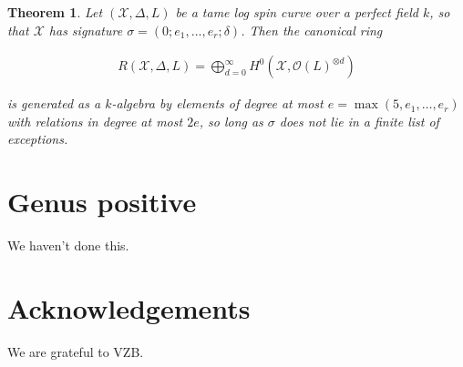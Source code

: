 \documentclass{amsart}
\theoremstyle{plain}
\newtheorem{thm}{Theorem}[section]
\theoremstyle{definition}
\theoremstyle{remark}
\numberwithin{equation}{section}
\newcommand \sx{\mathscr X}
\newcommand\sco{{\mathscr O}}
\begin{document}
\begin{thm}
\label{thm:g_0_generators_relations_rep}
Let $(\sx, \Delta, L)$ be a tame log spin curve over a perfect field $k$, so
that $\sx$ has signature $\sigma = (0; e_1, \ldots, e_r; \delta)$. Then the
canonical ring

\begin{align*}
	R(\sx, \Delta, L) = \bigoplus_{d = 0}^\infty H^0(\sx, \sco(L)^{\otimes d})
\end{align*}

\noindent
is generated as a $k$-algebra by elements of degree at most $e = 
\max(5,e_1,\ldots, e_r)$ with relations in degree at most $2e$, so 
long as $\sigma$ does not lie in a finite list of exceptions. 
\end{thm}

\section{Genus positive}
We haven't done this.

\section{Acknowledgements}
We are grateful to VZB.

\nocite{*}
{}

\end{document}
